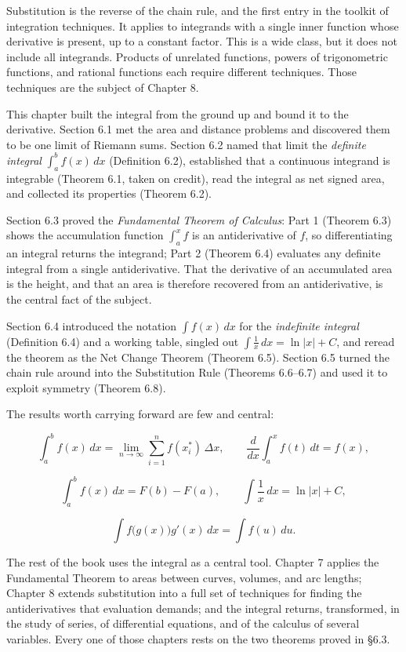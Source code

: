 \documentclass[a4paper,12pt,oneside]{memoir}
\begin{document}
Substitution is the reverse of the chain rule, and the first entry in the toolkit of integration techniques. It applies to integrands with a single inner function whose derivative is present, up to a constant factor. This is a wide class, but it does not include all integrands. Products of unrelated functions, powers of trigonometric functions, and rational functions each require different techniques. Those techniques are the subject of Chapter 8.

This chapter built the integral from the ground up and bound it to the derivative. Section 6.1 met the area and distance problems and discovered them to be one limit of Riemann sums. Section 6.2 named that limit the \emph{definite integral} \(\int_{a}^{b} f(x)\,dx\) (Definition 6.2), established that a continuous integrand is integrable (Theorem 6.1, taken on credit), read the integral as net signed area, and collected its properties (Theorem 6.2).

Section 6.3 proved the \emph{Fundamental Theorem of Calculus}: Part 1 (Theorem 6.3) shows the accumulation function \(\int_{a}^{x} f\) is an antiderivative of \(f\), so differentiating an integral returns the integrand; Part 2 (Theorem 6.4) evaluates any definite integral from a single antiderivative. That the derivative of an accumulated area is the height, and that an area is therefore recovered from an antiderivative, is the central fact of the subject.

Section 6.4 introduced the notation \(\int f(x)\,dx\) for the \emph{indefinite integral} (Definition 6.4) and a working table, singled out \(\int \tfrac{1}{x}\,dx = \ln\lvert x\rvert + C\), and reread the theorem as the Net Change Theorem (Theorem 6.5). Section 6.5 turned the chain rule around into the Substitution Rule (Theorems 6.6–6.7) and used it to exploit symmetry (Theorem 6.8).

The results worth carrying forward are few and central:

\[ \int_{a}^{b} f(x)\,dx = \lim_{n \to \infty} \sum_{i=1}^{n} f(x_{i}^{*})\,\Delta x, \qquad \frac{d}{dx}\int_{a}^{x} f(t)\,dt = f(x), \]

\[ \int_{a}^{b} f(x)\,dx = F(b) - F(a), \qquad \int \frac{1}{x}\,dx = \ln\lvert x\rvert + C, \]

\[ \int f\bigl(g(x)\bigr)g'(x)\,dx = \int f(u)\,du. \]

The rest of the book uses the integral as a central tool. Chapter 7 applies the Fundamental Theorem to areas between curves, volumes, and arc lengths; Chapter 8 extends substitution into a full set of techniques for finding the antiderivatives that evaluation demands; and the integral returns, transformed, in the study of series, of differential equations, and of the calculus of several variables. Every one of those chapters rests on the two theorems proved in §6.3.
\end{document}
